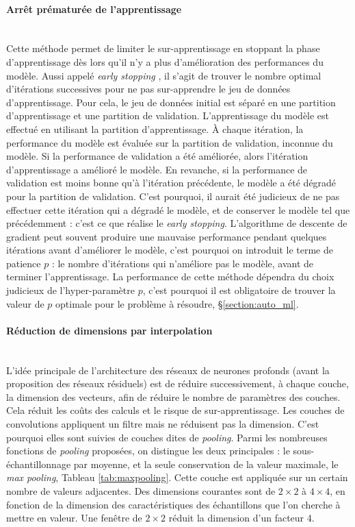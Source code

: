 \paragraph{Arrêt prématurée de l'apprentissage}\mbox{} \label{parag:early_stopping} \\
Cette méthode permet de limiter le sur-apprentissage en stoppant la phase d'apprentissage dès lors qu'il n'y a plus d'amélioration des performances du modèle.
Aussi appelé \textit{early stopping} \cite{yao_early_2007}, il s'agit de trouver le nombre optimal d'itérations successives pour ne pas sur-apprendre le jeu de données d'apprentissage.
Pour cela, le jeu de données initial est séparé en une partition d'apprentissage et une partition de validation.
L'apprentissage du modèle est effectué en utilisant la partition d'apprentissage.
À chaque itération, la performance du modèle est évaluée sur la partition de validation, inconnue du modèle.
Si la performance de validation a été améliorée, alors l'itération d'apprentissage a amélioré le modèle.
En revanche, si la performance de validation est moins bonne qu'à l'itération précédente, le modèle a été dégradé pour la partition de validation.
C'est pourquoi, il aurait été judicieux de ne pas effectuer cette itération qui a dégradé le modèle, et de conserver le modèle tel que précédemment : c'est ce que réalise le \textit{early stopping}.
L'algorithme de descente de gradient peut souvent produire une mauvaise performance pendant quelques itérations avant d'améliorer le modèle, c'est pourquoi on introduit le terme de patience $p$ : le nombre d'itérations qui n'améliore pas le modèle, avant de terminer l'apprentissage.
La performance de cette méthode dépendra du choix judicieux de l'hyper-paramètre $p$, c'est pourquoi il est obligatoire de trouver la valeur de $p$ optimale pour le problème à résoudre, §\ref{section:auto_ml}.

\paragraph{Réduction de dimensions par interpolation}\mbox{} \label{parag:pooling} \\
L'idée principale de l'architecture des réseaux de neurones profonds (avant la proposition des réseaux résiduels) est de réduire successivement, à chaque couche, la dimension des vecteurs, afin de réduire le nombre de paramètres des couches. Cela réduit les coûts des calculs et le risque de sur-apprentissage.
Les couches de convolutions appliquent un filtre mais ne réduisent pas la dimension.
C'est pourquoi elles sont suivies de couches dites de \textit{pooling}. Parmi les nombreuses fonctions de \textit{pooling} proposées, on distingue les deux principales : le sous-échantillonnage par moyenne, et la seule conservation de la valeur maximale, le \textit{max pooling}, Tableau \ref{tab:maxpooling}.
Cette couche est appliquée sur un certain nombre de valeurs adjacentes.
Des dimensions courantes sont de $2 \times 2$ à $4 \times 4$, en fonction de la dimension des caractéristiques des échantillons que l'on cherche à mettre en valeur.
Une fenêtre de $2 \times 2$ réduit la dimension d'un facteur 4.

